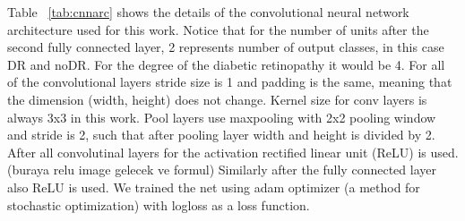 Table ~\ref{tab:cnnarc} shows the details of the convolutional neural network architecture used for this work. Notice that for the number of units after the second fully connected layer, 2 represents number of output classes, in this case DR and noDR. For the degree of the diabetic retinopathy it would be 4. For all of the convolutional layers stride size is 1 and padding is the same, meaning that the dimension (width, height) does not change. Kernel size for conv layers is always 3x3 in this work. Pool layers use maxpooling with 2x2 pooling window and stride is 2, such that after pooling layer width and height is divided by 2. After all convolutinal layers for the activation rectified linear unit (ReLU) is used. (buraya relu image gelecek ve formul) Similarly after the fully connected layer also ReLU is used. 
We trained the net using adam optimizer (a method for stochastic optimization) \citep{kingma2014adam} with  logloss as a loss function. 





